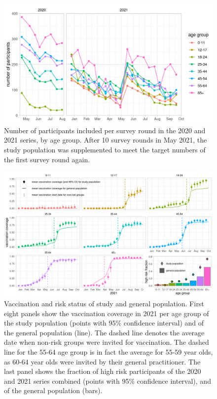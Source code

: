 \documentclass[fleqn,10pt]{wlscirep}
\begin{document}
\clearpage

\begin{figure}[ht]
\centering
\includegraphics[width=\linewidth]{../figures/number_participants.png}
\caption{Number of participants included per survey round in the 2020 and 2021 series, by age group. After 10 survey rounds in May 2021, the study population was supplemented to meet the target numbers of the first survey round again.}
\label{fig:part}
\end{figure}

\clearpage


\begin{figure}[ht]
\centering
\includegraphics[width=\linewidth]{../figures/vaccination_coverage_high_risk.png}
\caption{Vaccination and risk status of study and general population. First eight panels show the vaccination coverage in 2021 per age group of the study population (points with 95\% confidence interval) and of the general population \cite{RIVM_2022} (line). The dashed line denotes the average date when non-risk groups were invited for vaccination. The dashed line for the 55-64 age group is in fact the average for 55-59 year olds, as 60-64 year olds were invited by their general practitioner. The last panel shows the fraction of high risk participants of the 2020 and 2021 series combined (points with 95\% confidence interval), and of the general population \cite{Nivel_2021} (bars).}
\label{fig:vacc_risk}
\end{figure}
\end{document}
